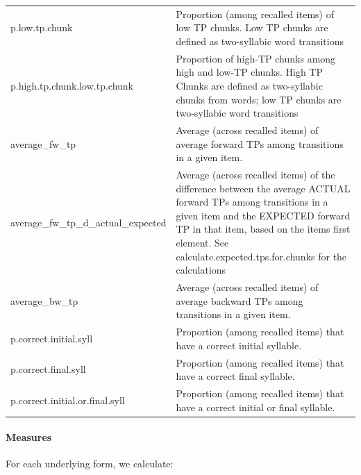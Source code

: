 \documentclass[]{article}
\let\oldparagraph\paragraph
\renewcommand{\paragraph}[1]{\oldparagraph{#1}\mbox{}}
\begin{document}
\begin{table}[!h]
{\begin{tabular}[t]{l>{\raggedright\arraybackslash}p{30em}}
\addlinespace
p.low.tp.chunk & Proportion (among recalled items) of low TP chunks. Low TP chunks are defined as two-syllabic word transitions\\
p.high.tp.chunk.low.tp.chunk & Proportion of high-TP chunks among high and low-TP chunks. High TP Chunks are defined as two-syllabic chunks from words; low TP chunks are two-syllabic word transitions\\
average\_fw\_tp & Average (across recalled items) of average forward TPs among transitions in a given item.\\
average\_fw\_tp\_d\_actual\_expected & Average (across recalled items) of the difference between the average ACTUAL forward TPs among transitions in a given item and the EXPECTED forward TP in that item, based on the items first element. See calculate.expected.tps.for.chunks for the calculations\\
average\_bw\_tp & Average (across recalled items) of average backward TPs among transitions in a given item.\\
\addlinespace
p.correct.initial.syll & Proportion (among recalled items) that have a correct initial syllable.\\
p.correct.final.syll & Proportion (among recalled items) that have a correct final syllable.\\
p.correct.initial.or.final.syll & Proportion (among recalled items) that have a correct initial or final syllable.\\
\bottomrule
\end{tabular}}
\end{table}


\paragraph{Measures}\label{measures}

For each underlying form, we calculate:
\end{document}

